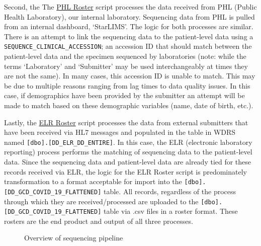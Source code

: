\documentclass[
  letterpaper,
  DIV=11,
  numbers=noendperiod]{scrartcl}
\begin{document}
Second, the The \href{@sec-phl}{PHL Roster} script processes the data
received from PHL (Public Health Laboratory), our internal laboratory.
Sequencing data from PHL is pulled from an internal dashboard,
`StarLIMS'. The logic for both processes are similar. There is an
attempt to link the sequencing data to the patient-level data using a
\texttt{SEQUENCE\_CLINICAL\_ACCESSION}; an accession ID that should
match between the patient-level data and the specimen sequenced by
laboratories (note: while the terms `Laboratory' and `Submitter' may be
used interchangeably at times they are not the same). In many cases,
this accession ID is unable to match. This may be due to multiple
reasons ranging from lag times to data quality issues. In this case, if
demographics have been provided by the submitter an attempt will be made
to match based on these demographic variables (name, date of birth,
etc.).

Lastly, the \href{@sec-elr}{ELR Roster} script processes the data from
external submitters that have been received via HL7 messages and
populated in the table in WDRS named
\texttt{{[}dbo{]}.{[}DD\_ELR\_DD\_ENTIRE{]}}. In this case, the ELR
(electronic laboratory reporting) process performs the matching of
sequencing data to the patient-level data. Since the sequencing data and
patient-level data are already tied for these records received via ELR,
the logic for the ELR Roster script is predominately transformation to a
format acceptable for import into the
\texttt{{[}dbo{]}.{[}DD\_GCD\_COVID\_19\_FLATTENED{]}} table. All
records, regardless of the process through which they are
received/processed are uploaded to the
\texttt{{[}dbo{]}.{[}DD\_GCD\_COVID\_19\_FLATTENED{]}} table via .csv
files in a roster format. These rosters are the end product and output
of all three processes.

\begin{figure}[H]


\caption{\label{fig-overview}Overview of sequencing pipeline}

\end{figure}%
\end{document}
